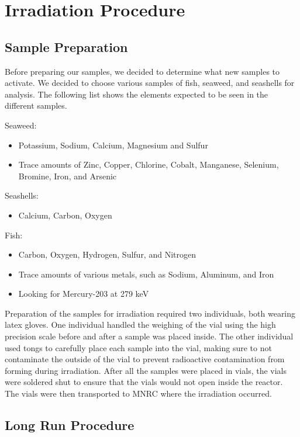 \documentclass[]{article}
\begin{document}
\pagebreak
 

\section{Irradiation Procedure}

\subsection{Sample Preparation}
Before preparing our samples, we decided to determine what new samples to activate. We decided to choose various samples of fish, seaweed, and seashells for analysis. The following list shows the elements expected to be seen in the different samples.

Seaweed:
\begin{itemize}
\item Potassium, Sodium, Calcium, Magnesium and Sulfur
\item Trace amounts of Zinc, Copper, Chlorine, Cobalt, Manganese, Selenium, Bromine, Iron, and Arsenic
\end{itemize}
Seashells:
\begin{itemize}
\item Calcium, Carbon, Oxygen
\end{itemize}
Fish:
\begin{itemize}
\item Carbon, Oxygen, Hydrogen, Sulfur, and Nitrogen
\item Trace amounts of various metals, such as Sodium, Aluminum, and Iron
\item Looking for Mercury-203 at 279 keV
\end{itemize}


Preparation of the samples for irradiation required two individuals, both wearing latex gloves. One individual handled the weighing of the vial using the high precision scale before and after a sample was placed inside. The other individual used tongs to carefully place each sample into the vial, making sure to not contaminate the outside of the vial to prevent radioactive contamination from forming during irradiation. After all the samples were placed in vials, the vials were soldered shut to ensure that the vials would not open inside the reactor. The vials were then transported to MNRC where the irradiation occurred. 

\subsection{Long Run Procedure}
\end{document}
